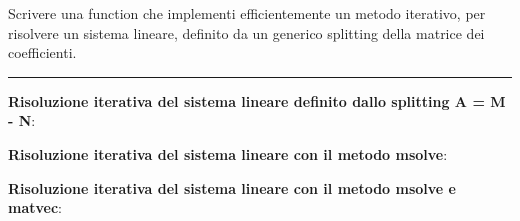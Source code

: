 Scrivere una function che implementi efficientemente un metodo iterativo, per risolvere un sistema lineare,
definito da un generico splitting della matrice dei coefficienti.

\hspace*{\fill}
\par\noindent\rule{\textwidth}{0.4pt}
\hspace*{\fill}

\begin{minipage}{\textwidth}
    \textbf{Risoluzione iterativa del sistema lineare definito dallo splitting A = M - N}:
    
\end{minipage}
\begin{minipage}{\textwidth}
    \textbf{Risoluzione iterativa del sistema lineare con il metodo msolve}:
    
\end{minipage}
\begin{minipage}{\textwidth}
    \textbf{Risoluzione iterativa del sistema lineare con il metodo msolve e matvec}:
    
\end{minipage}
